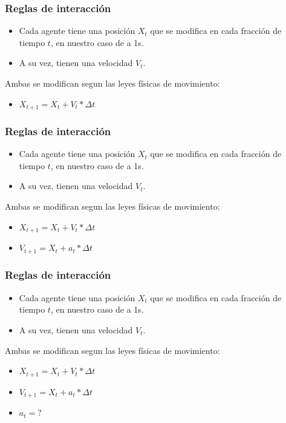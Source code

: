 \documentclass[10pt, compress]{beamer}
\begin{document}
\begin{frame}[fragile]

\frametitle{Reglas de interacci\'on}
\begin{itemize}
\item Cada agente tiene una posici\'on $X_t$ que se modifica en cada fracci\'on de tiempo $t$, en nuestro caso de a 1s.
\item A su vez, tienen una velocidad $V_t$.
\end{itemize}
Ambas se modifican segun las leyes f\'isicas de movimiento:
\begin{itemize}
\item $X_{t+1} = X_t + V_t * \Delta t$
\end{itemize}

\end{frame}

\begin{frame}[fragile]

\frametitle{Reglas de interacci\'on}
\begin{itemize}
\item Cada agente tiene una posici\'on $X_t$ que se modifica en cada fracci\'on de tiempo $t$, en nuestro caso de a 1s.
\item A su vez, tienen una velocidad $V_t$.
\end{itemize}
Ambas se modifican segun las leyes f\'isicas de movimiento:
\begin{itemize}
\item $X_{t+1} = X_t + V_t * \Delta t$
\item $V_{t+1} = X_t + a_t * \Delta t$
\end{itemize}

\end{frame}

\begin{frame}[fragile]

\frametitle{Reglas de interacci\'on}
\begin{itemize}
\item Cada agente tiene una posici\'on $X_t$ que se modifica en cada fracci\'on de tiempo $t$, en nuestro caso de a 1s.
\item A su vez, tienen una velocidad $V_t$.
\end{itemize}
Ambas se modifican segun las leyes f\'isicas de movimiento:
\begin{itemize}
\item $X_{t+1} = X_t + V_t * \Delta t$
\item $V_{t+1} = X_t + a_t * \Delta t$
\item $a_t = ?$ 
\end{itemize}

\end{frame}
\end{document}
